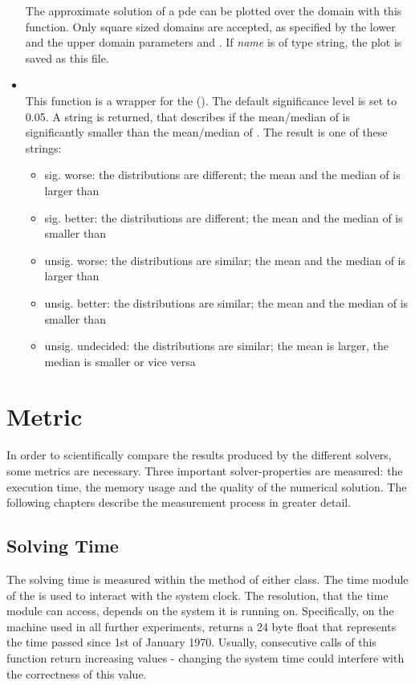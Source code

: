 \documentclass[./\jobname.tex]{subfiles}
\begin{document}
\begin{itemize}
	The approximate solution of a \gls{pde} can be plotted over the domain with this function. Only square sized domains are accepted, as specified by the lower and the upper domain parameters  and . If \textit{name} is of type string, the plot is saved as this file.
	\item 
	 \\
	This function is a wrapper for the  (\cite{scipy_scipystatswilcoxon_2020}). The default significance level is set to 0.05. A string is returned, that describes if the mean/median of  is significantly smaller than the mean/median of . The result is one of these strings: 
	\begin{itemize}
		\item sig. worse: the distributions are different; the mean and the median of  is larger than 
		\item sig. better: the distributions are different; the mean and the median of  is smaller than 
		\item unsig. worse: the distributions are similar; the mean and the median of  is larger than  
		\item unsig. better: the distributions are similar; the mean and the median of  is smaller than 
		\item unsig. undecided: the distributions are similar; the mean is larger, the median is smaller or vice versa
	\end{itemize} 
\end{itemize}

\section{Metric} 
\label{chap:metric}
In order to scientifically compare the results produced by the different solvers, some metrics are necessary. Three important solver-properties are measured: the execution time, the memory usage and the quality of the numerical solution. The following chapters describe the measurement process in greater detail. 

\subsection{Solving Time}
\label{chap:metric_time}
The solving time is measured within the  method of either class. The time module of the \cite{python_standard_library_time_2020} is used to interact with the system clock. The resolution, that the time module can access, depends on the system it is running on. Specifically, on the machine used in all further experiments,  returns a 24 byte float that represents the time passed since 1st of January 1970. Usually, consecutive calls of this function return increasing values - changing the system time could interfere with the correctness of this value.\\ 
\end{document}
